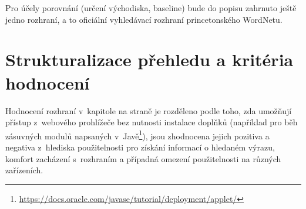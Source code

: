 \documentclass[a4paper,11pt,openany,twoside]{book}
\newcommand{\itNameRef}[1]{\textit{\nameref{#1}}}
\begin{document}

				Pro účely porovnání (určení východiska, baseline) bude do popisu zahrnuto ještě jedno rozhraní, a to oficiální vyhledávací rozhraní princetonského WordNetu.

			\section{Strukturalizace přehledu a kritéria hodnocení}
			\label{cha:structhodnoc}

				Hodnocení rozhraní v~kapitole \itNameRef{cha:porovnani} na straně \pageref{cha:porovnani} je rozděleno podle toho, zda umožňují přístup z~webového prohlížeče bez nutnosti instalace doplňků (například pro běh zásuvných modulů napsaných v~Javě\footnote{\url{https://docs.oracle.com/javase/tutorial/deployment/applet/}}), jsou zhodnocena jejich pozitiva a negativa z~hlediska použitelnosti pro získání informací o hledaném výrazu, komfort zacházení s~rozhraním a případná omezení použitelnosti na různých zařízeních. 
\end{document}
